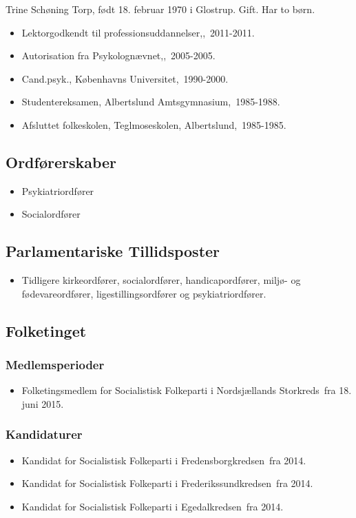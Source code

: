 \documentclass[11pt, a4paper]{awesome-cv}
\begin{document}
\makecvheader[R]
\makelettertitle
\begin{cvletter}
Trine Schøning Torp, født 18. februar 1970 i Glostrup. Gift. Har to børn.

\begin{itemize}
\item Lektorgodkendt til professionsuddannelser,, 2011-2011.
\item Autorisation fra Psykolognævnet,, 2005-2005.
\item Cand.psyk., Københavns Universitet, 1990-2000.
\item Studentereksamen, Albertslund Amtsgymnasium, 1985-1988.
\item Afsluttet folkeskolen, Teglmoseskolen, Albertslund, 1985-1985.
\end{itemize}
\subsection*{Ordførerskaber}
\begin{itemize}
\item Psykiatriordfører
\item Socialordfører
\end{itemize}
\subsection*{Parlamentariske Tillidsposter}
\begin{itemize}
\item Tidligere kirkeordfører, socialordfører, handicapordfører, miljø- og fødevareordfører, ligestillingsordfører og psykiatriordfører.
\end{itemize}
\subsection*{Folketinget}
\subsubsection*{Medlemsperioder}
\begin{itemize}
\item Folketingsmedlem for Socialistisk Folkeparti i Nordsjællands Storkreds fra 18. juni 2015.
\end{itemize}
\subsubsection*{Kandidaturer}
\begin{itemize}
\item Kandidat for Socialistisk Folkeparti i Fredensborgkredsen fra 2014.
\item Kandidat for Socialistisk Folkeparti i Frederikssundkredsen fra 2014.
\item Kandidat for Socialistisk Folkeparti i Egedalkredsen fra 2014.
\end{itemize}

\end{cvletter}
\end{document}
